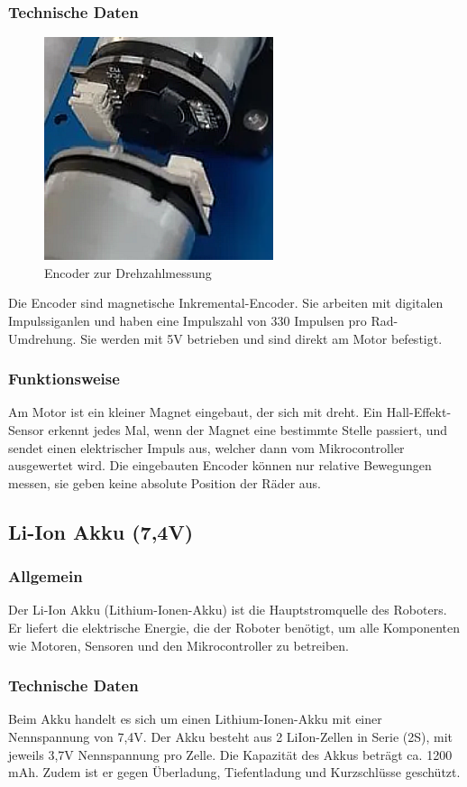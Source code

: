 \subsubsection{Technische Daten}
\begin{figure}[H]
    \centering
    \includegraphics[width=0.6\textwidth]{img/Hardware/encoder.png}
    \caption{Encoder zur Drehzahlmessung}
    \label{fig:encoder}
\end{figure}
Die Encoder sind magnetische Inkremental-Encoder.
Sie arbeiten mit digitalen Impulssiganlen und haben eine Impulszahl von 330 Impulsen pro Rad-Umdrehung.
%
Sie werden mit 5V betrieben und sind direkt am Motor befestigt.
\subsubsection{Funktionsweise}
Am Motor ist ein kleiner Magnet eingebaut,
der sich mit dreht.
%
Ein Hall-Effekt-Sensor erkennt jedes Mal,
wenn der Magnet eine bestimmte Stelle passiert,
und sendet einen elektrischer Impuls aus,
welcher dann vom Mikrocontroller ausgewertet wird.
%
Die eingebauten Encoder können nur relative Bewegungen messen,
sie geben keine absolute Position der Räder aus.
%
\subsection{Li-Ion Akku (7,4V)}
%
\subsubsection{Allgemein}
Der Li-Ion Akku (Lithium-Ionen-Akku) ist die Hauptstromquelle des Roboters.
% 
Er liefert die elektrische Energie, die der Roboter benötigt,
um alle Komponenten wie Motoren, Sensoren und den Mikrocontroller zu betreiben.
%
\subsubsection{Technische Daten}
Beim Akku handelt es sich um einen Lithium-Ionen-Akku mit einer Nennspannung von 7,4V.
%
Der Akku besteht aus 2 LiIon-Zellen in Serie (2S), mit jeweils 3,7V Nennspannung pro Zelle.
Die Kapazität des Akkus beträgt ca. 1200 mAh.
%
Zudem ist er gegen Überladung, Tiefentladung und Kurzschlüsse geschützt.
%


